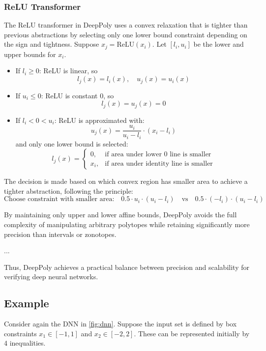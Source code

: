 \documentclass[oneside,11pt,dvipsnames]{book}
\begin{document}
\subsubsection{ReLU Transformer}

The ReLU transformer in DeepPoly uses a convex relaxation that is tighter than previous abstractions by selecting only one lower bound constraint depending on the sign and tightness. Suppose \(x_j = \text{ReLU}(x_i)\). Let \([l_i, u_i]\) be the lower and upper bounds for \(x_i\).

\begin{itemize}
    \item If \(l_i \geq 0\): ReLU is linear, so
    \[
    l_j(x) = l_i(x), \quad u_j(x) = u_i(x)
    \]

    \item If \(u_i \leq 0\): ReLU is constant 0, so
    \[
    l_j(x) = u_j(x) = 0
    \]

    \item If \(l_i < 0 < u_i\): ReLU is approximated with:
    \[
    u_j(x) = \frac{u_i}{u_i - l_i} \cdot (x_i - l_i)
    \]
    and only one lower bound is selected:
    \[
    l_j(x) =
    \begin{cases}
        0, & \text{if area under lower 0 line is smaller} \\
        x_i, & \text{if area under identity line is smaller}
    \end{cases}
    \]
\end{itemize}

The decision is made based on which convex region has smaller area to achieve a tighter abstraction, following the principle:
\[
\text{Choose constraint with smaller area:} \quad 0.5 \cdot u_i \cdot (u_i - l_i) \quad \text{vs} \quad 0.5 \cdot (-l_i) \cdot (u_i - l_i)
\]


By maintaining only upper and lower affine bounds, DeepPoly avoids the full complexity of manipulating arbitrary polytopes while retaining significantly more precision than intervals or zonotopes. 

...

Thus, DeepPoly achieves a practical balance between precision and scalability for verifying deep neural networks.

\subsection{Example}

Consider again the DNN in \autoref{fig:dnn}. Suppose the input set is defined by box constraints \(x_1 \in [-1,1]\) and \(x_2 \in [-2,2]\). These can be represented initially by 4 inequalities.
\end{document}
